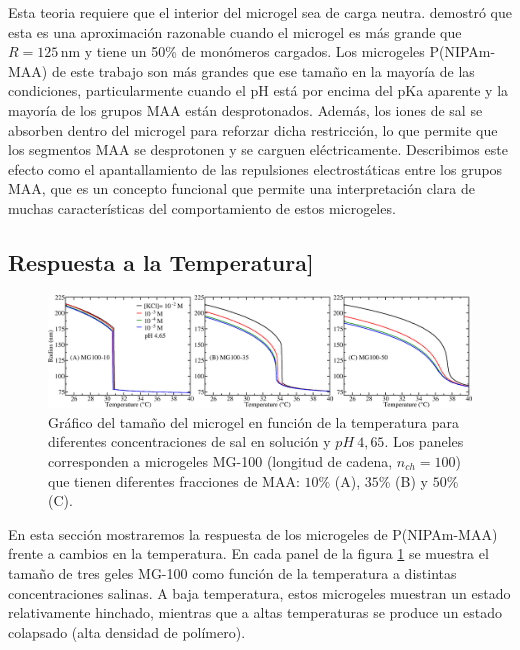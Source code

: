 Esta teoria requiere que el interior del microgel sea de carga neutra.
 demostr\'o que esta es una aproximación razonable cuando el microgel es m\'as grande que $R=125\,\text{nm}$ y tiene un 50\% de mon\'omeros cargados.
Los microgeles P(NIPAm-MAA) de este trabajo son m\'as grandes que ese tama\~no en la mayor\'ia de las condiciones, particularmente cuando el pH está por encima del pKa aparente y la mayor\'ia de los grupos MAA est\'an desprotonados.
Adem\'as, los iones de sal se absorben dentro del microgel para reforzar dicha restricci\'on, lo que permite que los segmentos MAA se desprotonen y se carguen el\'ectricamente.
Describimos este efecto como el apantallamiento de las repulsiones electrost\'aticas entre los grupos MAA, que es un concepto funcional que permite una interpretaci\'on clara de muchas caracter\'isticas del comportamiento de estos microgeles. %




\subsection{Respuesta a la Temperatura]}\label{sec:temperature}

\begin{figure}[!htb]
	\centering
	\includegraphics[width=1\linewidth]{Figures/graph-gel/R-T.png}
	\caption{Gr\'afico del tama\~no del microgel en funci\'on de la temperatura para diferentes concentraciones de sal en soluci\'on y $pH~4,65$.
		Los paneles corresponden a microgeles MG-100 (longitud de cadena, $n_{ch}=100$) que tienen diferentes fracciones de MAA: $10\%$ (A), $35\%$ (B) y $50\%$ (C).}
	\label{fig:R-T}
\end{figure}


En esta secci\'on mostraremos la respuesta de los microgeles de P(NIPAm-MAA) frente a cambios en la temperatura.
En cada panel de la figura \ref{fig:R-T} se muestra el tama\~no de tres geles MG-100 como funci\'on de la temperatura a distintas concentraciones salinas.
A baja temperatura, estos microgeles muestran un estado relativamente hinchado, mientras que a altas temperaturas se produce un estado colapsado (alta densidad de polímero).


